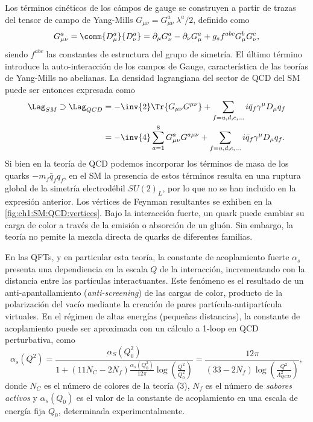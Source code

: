 Los términos cinéticos de los cámpos de gauge se construyen a partir de trazas del tensor de campo de Yang-Mills $G_{\mu\nu} = G_{\mu\nu}^a \ \lambda^a/2$, definido como
\[ G_{\mu\nu}^a = \comm{D_\mu^a}{D_\nu^a} = \partial_\mu G^a_\nu - \partial_\nu G^a_\mu + g_s f^{abc} G^b_\mu G^c_\nu, \]
siendo $f^{abc}$ las constantes de estructura del grupo de simetría. El último término introduce la auto-interacción de los campos de Gauge, característica de las teorías de Yang-Mills no abelianas. La densidad lagrangiana del sector de QCD del SM puede ser entonces expresada como
\begin{align*}
  \Lag_{SM} \supset \Lag_{QCD} &= -\inv{2} \Tr{G_{\mu\nu} G^{\mu\nu}} + \sum_{f = u, d, c, \dots} i \bar{q}_f \gamma^\mu D_\mu q_f \\
             &= -\inv{4} \sum_{a = 1}^8 G_{\mu\nu}^a G^{a\mu\nu} + \sum_{f = u, d, c, \dots} i \bar{q}_f \gamma^\mu D_\mu q_f.
\end{align*}
Si bien en la teoría de QCD podemos incorporar los términos de masa de los quarks $-m_f \bar{q}_f q_f$, en el SM la presencia de estos términos resulta en una ruptura global de la simetría electrodébil $SU(2)_L$, por lo que no se han incluido en la expresión anterior. Los vértices de Feynman resultantes se exhiben en la \cref{fig:ch1:SM:QCD:vertices}. Bajo la interacción fuerte, un quark puede cambiar su carga de color a través de la emisión o absorción de un gluón. Sin embargo, la teoría no pemite la mezcla directa de quarks de diferentes familias.

En las QFTs, y en particular esta teoría, la constante de acoplamiento fuerte $\alpha_s$ presenta una dependiencia en la escala $Q$ de la interacción, incrementando con la distancia entre las partículas interactuantes. Este fenómeno es el resultado de un anti-apantallamiento (\textit{anti-screening}) de las cargas de color, producto de la polarización del vacío mediante la creación de pares partícula-antipartícula virtuales. En el régimen de altas energías (pequeñas distancias), la constante de acoplamiento puede ser aproximada con un cálculo a 1-loop en QCD perturbativa, como
\[ \alpha_s(Q^2) = \frac{\alpha_S(Q_0^2)}{1 + (11 N_C - 2 N_f) \frac{\alpha_s(Q_0^2)}{12\pi} \log(\frac{Q^2}{Q_0^2})} = \frac{12\pi}{(33 - 2N_f) \log(\frac{Q^2}{\Lambda^2_{QCD}})}, \]
donde $N_C$ es el número de colores de la teoría (3), $N_f$ es el número de \textit{sabores activos} y $\alpha_s(Q_0)$ es el valor de la constante de acoplamiento en una escala de energía fija $Q_0$, determinada experimentalmente.

